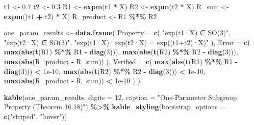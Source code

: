 \documentclass[
]{book}
\newenvironment{Shaded}{\begin{snugshade}}{\end{snugshade}}
\newcommand{\AttributeTok}[1]{\textcolor[rgb]{0.13,0.29,0.53}{#1}}
\newcommand{\DecValTok}[1]{\textcolor[rgb]{0.00,0.00,0.81}{#1}}
\newcommand{\FloatTok}[1]{\textcolor[rgb]{0.00,0.00,0.81}{#1}}
\newcommand{\FunctionTok}[1]{\textcolor[rgb]{0.13,0.29,0.53}{\textbf{#1}}}
\newcommand{\NormalTok}[1]{#1}
\newcommand{\OtherTok}[1]{\textcolor[rgb]{0.56,0.35,0.01}{#1}}
\newcommand{\SpecialCharTok}[1]{\textcolor[rgb]{0.81,0.36,0.00}{\textbf{#1}}}
\newcommand{\StringTok}[1]{\textcolor[rgb]{0.31,0.60,0.02}{#1}}
\theoremstyle{definition}
\theoremstyle{definition}
\theoremstyle{definition}
\theoremstyle{definition}
\theoremstyle{remark}
\begin{document}
\begin{Shaded}
\begin{Highlighting}[]
\NormalTok{t1 }\OtherTok{\textless{}{-}} \FloatTok{0.7}
\NormalTok{t2 }\OtherTok{\textless{}{-}} \FloatTok{0.3}
\NormalTok{R1 }\OtherTok{\textless{}{-}} \FunctionTok{expm}\NormalTok{(t1 }\SpecialCharTok{*}\NormalTok{ X)}
\NormalTok{R2 }\OtherTok{\textless{}{-}} \FunctionTok{expm}\NormalTok{(t2 }\SpecialCharTok{*}\NormalTok{ X)}
\NormalTok{R\_sum }\OtherTok{\textless{}{-}} \FunctionTok{expm}\NormalTok{((t1 }\SpecialCharTok{+}\NormalTok{ t2) }\SpecialCharTok{*}\NormalTok{ X)}
\NormalTok{R\_product }\OtherTok{\textless{}{-}}\NormalTok{ R1 }\SpecialCharTok{\%*\%}\NormalTok{ R2}

\NormalTok{one\_param\_results }\OtherTok{\textless{}{-}} \FunctionTok{data.frame}\NormalTok{(}
  \AttributeTok{Property =} \FunctionTok{c}\NormalTok{(}
    \StringTok{"exp(t1·X) ∈ SO(3)"}\NormalTok{,}
    \StringTok{"exp(t2·X) ∈ SO(3)"}\NormalTok{,}
    \StringTok{"exp(t1·X)·exp(t2·X) = exp((t1+t2)·X)"}
\NormalTok{  ),}
  \AttributeTok{Error =} \FunctionTok{c}\NormalTok{(}
    \FunctionTok{max}\NormalTok{(}\FunctionTok{abs}\NormalTok{(}\FunctionTok{t}\NormalTok{(R1) }\SpecialCharTok{\%*\%}\NormalTok{ R1 }\SpecialCharTok{{-}} \FunctionTok{diag}\NormalTok{(}\DecValTok{3}\NormalTok{))),}
    \FunctionTok{max}\NormalTok{(}\FunctionTok{abs}\NormalTok{(}\FunctionTok{t}\NormalTok{(R2) }\SpecialCharTok{\%*\%}\NormalTok{ R2 }\SpecialCharTok{{-}} \FunctionTok{diag}\NormalTok{(}\DecValTok{3}\NormalTok{))),}
    \FunctionTok{max}\NormalTok{(}\FunctionTok{abs}\NormalTok{(R\_product }\SpecialCharTok{{-}}\NormalTok{ R\_sum))}
\NormalTok{  ),}
  \AttributeTok{Verified =} \FunctionTok{c}\NormalTok{(}
    \FunctionTok{max}\NormalTok{(}\FunctionTok{abs}\NormalTok{(}\FunctionTok{t}\NormalTok{(R1) }\SpecialCharTok{\%*\%}\NormalTok{ R1 }\SpecialCharTok{{-}} \FunctionTok{diag}\NormalTok{(}\DecValTok{3}\NormalTok{))) }\SpecialCharTok{\textless{}} \FloatTok{1e{-}10}\NormalTok{,}
    \FunctionTok{max}\NormalTok{(}\FunctionTok{abs}\NormalTok{(}\FunctionTok{t}\NormalTok{(R2) }\SpecialCharTok{\%*\%}\NormalTok{ R2 }\SpecialCharTok{{-}} \FunctionTok{diag}\NormalTok{(}\DecValTok{3}\NormalTok{))) }\SpecialCharTok{\textless{}} \FloatTok{1e{-}10}\NormalTok{,}
    \FunctionTok{max}\NormalTok{(}\FunctionTok{abs}\NormalTok{(R\_product }\SpecialCharTok{{-}}\NormalTok{ R\_sum)) }\SpecialCharTok{\textless{}} \FloatTok{1e{-}10}
\NormalTok{  )}
\NormalTok{)}

\FunctionTok{kable}\NormalTok{(one\_param\_results,}
      \AttributeTok{digits =} \DecValTok{12}\NormalTok{,}
      \AttributeTok{caption =} \StringTok{"One{-}Parameter Subgroup Property (Theorem 16.18)"}\NormalTok{) }\SpecialCharTok{\%\textgreater{}\%}
  \FunctionTok{kable\_styling}\NormalTok{(}\AttributeTok{bootstrap\_options =} \FunctionTok{c}\NormalTok{(}\StringTok{"striped"}\NormalTok{, }\StringTok{"hover"}\NormalTok{))}
\end{Highlighting}
\end{Shaded}
\end{document}
